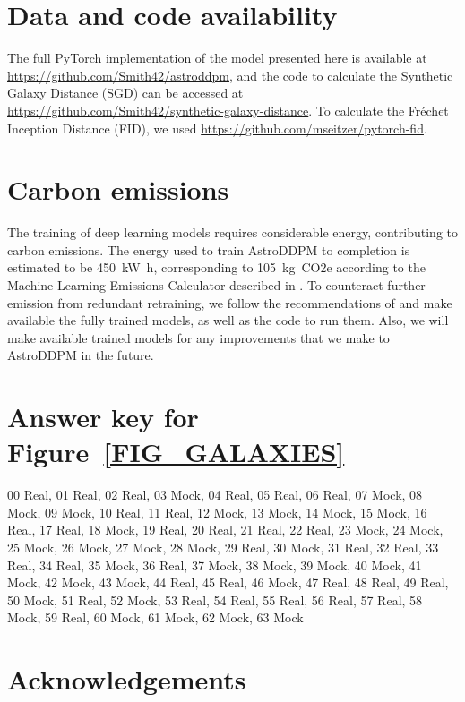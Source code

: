 \documentclass[fleqn,usenatbib]{mnras}
\begin{document}
\section*{Data and code availability}
  
The full PyTorch \citep{cite_pytorch} implementation of the model presented
here is available at \url{https://github.com/Smith42/astroddpm}, and the code
to calculate the Synthetic Galaxy Distance (SGD) can be accessed at
\url{https://github.com/Smith42/synthetic-galaxy-distance}. To calculate the
Fr\'echet Inception Distance (FID), we used
\url{https://github.com/mseitzer/pytorch-fid}.  

\section*{Carbon emissions}

The training of deep learning models requires considerable energy, contributing
to carbon emissions. The energy used to train AstroDDPM to completion is
estimated to be \SI{450}{\kilo\watt\hour}, corresponding to
\SI{105}{\kilo\gram.CO2e} according to the Machine Learning Emissions
Calculator described in \citet{cite_lacoste2019}.  To counteract further
emission from redundant retraining, we follow the recommendations of
\citet{cite_strubell2019} and make available the fully trained models, as well
as the code to run them. Also, we will make available trained models for any
improvements that we make to AstroDDPM in the future.

\section*{Answer key for Figure~\ref{FIG_GALAXIES}}

00 Real, 01 Real, 02 Real, 03 Mock, 04 Real, 05 Real, 06 Real, 07 Mock, 08 Mock, 09 Mock, 10 Real, 11 Real, 12 Mock, 13 Mock, 14 Mock, 15 Mock, 16 Real, 17 Real, 18 Mock, 19 Real, 20 Real, 21 Real, 22 Real, 23 Mock, 24 Mock, 25 Mock, 26 Mock, 27 Mock, 28 Mock, 29 Real, 30 Mock, 31 Real, 32 Real, 33 Real, 34 Real, 35 Mock, 36 Real, 37 Mock, 38 Mock, 39 Mock, 40 Mock, 41 Mock, 42 Mock, 43 Mock, 44 Real, 45 Real, 46 Mock, 47 Real, 48 Real, 49 Real, 50 Mock, 51 Real, 52 Mock, 53 Real, 54 Real, 55 Real, 56 Real, 57 Real, 58 Mock, 59 Real, 60 Mock, 61 Mock, 62 Mock, 63 Mock

\section*{Acknowledgements}
\end{document}
